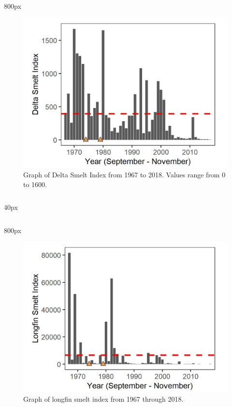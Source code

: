 \documentclass[
]{book}
\begin{document}
\begin{column}{800px\textwidth}
\begin{figure}
\includegraphics[width=15.25in]{figures/FMWT_DS_1966} \caption{Graph of Delta Smelt Index from 1967 to 2018. Values range from 0 to 1600.}\label{fig:unnamed-chunk-124}
\end{figure}
\end{column}

\begin{column}{40px\textwidth}
~
\end{column}

\begin{column}{800px\textwidth}
\begin{figure}
\includegraphics[width=15.25in]{figures/FMWT_LFS_1966} \caption{Graph of longfin smelt index from 1967 through 2018.}\label{fig:unnamed-chunk-125}
\end{figure}
\end{column}
\end{document}
